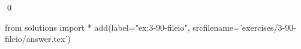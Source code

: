 
\begin{ex}
  \label{ex:3-90-fileio}
  
  \qed
\end{ex}
\begin{python0}
from solutions import *
add(label="ex:3-90-fileio",
    srcfilename='exercises/3-90-fileio/answer.tex')
\end{python0}
